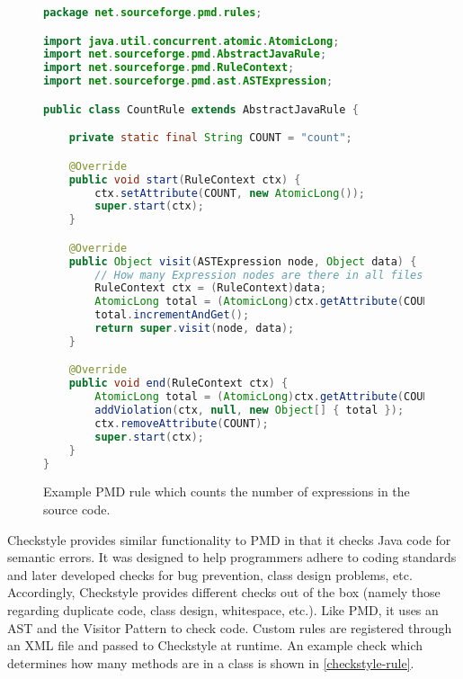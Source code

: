 \documentclass[12pt]{report}
\begin{document}
\begin{figure}
\begin{lstlisting}[language=Java]
package net.sourceforge.pmd.rules;

import java.util.concurrent.atomic.AtomicLong;
import net.sourceforge.pmd.AbstractJavaRule;
import net.sourceforge.pmd.RuleContext;
import net.sourceforge.pmd.ast.ASTExpression;

public class CountRule extends AbstractJavaRule {

	private static final String COUNT = "count";

	@Override
	public void start(RuleContext ctx) {
		ctx.setAttribute(COUNT, new AtomicLong());
		super.start(ctx);
	}

	@Override
	public Object visit(ASTExpression node, Object data) {
		// How many Expression nodes are there in all files parsed! 
		RuleContext ctx = (RuleContext)data;
		AtomicLong total = (AtomicLong)ctx.getAttribute(COUNT);
		total.incrementAndGet();
		return super.visit(node, data);
	}

	@Override
	public void end(RuleContext ctx) {
		AtomicLong total = (AtomicLong)ctx.getAttribute(COUNT);
		addViolation(ctx, null, new Object[] { total });
		ctx.removeAttribute(COUNT);
		super.start(ctx);
	}
}
\end{lstlisting}
\caption[Example PMD Rule]{Example PMD rule which counts the number of expressions in the source code.}
\label{pmd-rule}
\end{figure}

Checkstyle provides similar functionality to PMD in that it checks Java code for semantic errors.  It was 
designed to help programmers adhere to coding standards and later developed checks for bug 
prevention, class design problems, etc. Accordingly, Checkstyle provides different checks out of the box 
(namely those regarding duplicate code, class design, whitespace, etc.). Like PMD, it uses an AST and 
the Visitor Pattern to check code. Custom rules are registered through an XML file and passed to 
Checkstyle at runtime. An example check which determines how many methods are in a class is shown 
in \autoref{checkstyle-rule}.
\end{document}
